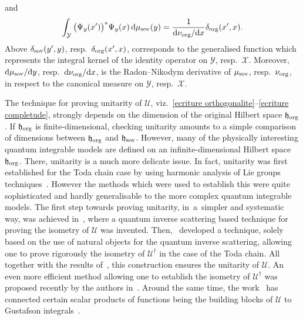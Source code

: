 \documentclass[pdftex]{sigma}%
\numberwithin{equation}{section}
\begin{document}
and
\begin{gather}
\int_{ \mathcal{Y} } \big( \Psi_{y}({x}') \big)^* \Psi_{y}(x) \,{\rm d}\mu_{\rm sov}(y) = \frac{1}{{\rm d}\nu_{\rm org}/ {\rm d}x}\delta_{\rm org}({x}',x).
\label{ecriture completude}
\end{gather}
Above $\delta_{\rm sov}({y}',y)$, resp.~$\delta_{\rm org}({x}',x)$, corresponds to the generalised function which represents the
integral kernel of the identity operator on $\mathcal{Y}$, resp.~$\mathcal{X}$. Moreover, ${\rm d}\mu_{\rm sov}/ {\rm d}y$, resp.~${\rm d}\nu_{\rm org}/ {\rm d}x$, is the Radon--Nikodym derivative of $\mu_{\rm sov}$, resp.~$\nu_{\rm org}$, in respect to the canonical
measure on $\mathcal{Y}$, resp.~$\mathcal{X}$.

The technique for proving unitarity of $\mathcal{U}$, viz.~\eqref{ecriture orthogonalite}--\eqref{ecriture completude}, strongly
depends on the dimension of the original Hilbert space $\mathfrak{h}_{\rm org}$. If $\mathfrak{h}_{\rm org}$ is finite-dimensional,
checking unitarity amounts to a simple comparison of dimensions between $\mathfrak{h}_{\rm org}$ and $\mathfrak{h}_{\rm sov}$.
However, many of the physically interesting quantum integrable models are defined on an infinite-dimensional Hilbert space
$\mathfrak{h}_{\rm org}$. There, unitarity is a much more delicate issue. In fact, unitarity was first established for the Toda chain
case by using harmonic analysis of Lie groups techniques~\cite{SemenovTian, WallachRealReductiveGroupsII}. However the methods which were
used to establish this were quite sophisticated and hardly generalisable to the more complex quantum integrable models. The first step
towards proving unitarity, in~a~simpler and systematic way, was achieved in~\cite{DerkachovKorchemskyManashovXXXSoVandQopNewConstEigenfctsBOp}, where a quantum inverse scattering based technique for proving the
isometry of $\mathcal{U}$ was invented. Then,~\cite{Kozlowski:2014jka} developed a technique, solely based on the use of natural objects
for the quantum inverse scattering, allowing one to prove rigorously the isometry of $\mathcal{U}^{\dagger}$ in the case of the Toda
chain. All together with the results of~\cite{DerkachovKorchemskyManashovXXXSoVandQopNewConstEigenfctsBOp}, this construction ensures the
unitarity of $\mathcal{U}$. An even more efficient method allowing one to establish the isometry of $\mathcal{U}^{\dagger}$ was proposed
recently by the authors in~\cite{KozDerkachovManashovUnitaritySoVTransformModularXXZ}. Around the same time, the work~\cite{DMspinchainandSL2RGustafson} has connected certain scalar products of functions being the building blocks of $\mathcal{U}$ to
Gustafson integrals~\cite{MR1139492}.
\end{document}
